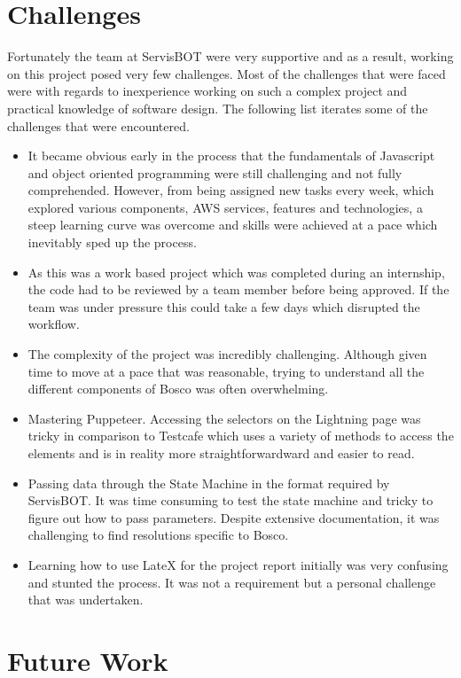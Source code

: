 \documentclass[12pt,a4paper,titlepage]{report}
\begin{document}
\section{Challenges}
Fortunately the team at ServisBOT were very supportive and as a result, working on this project posed very few challenges. 
Most of the challenges that were faced were with regards to inexperience working on such a complex project and practical knowledge of software design.
The following list iterates some of the challenges that were encountered.
\begin{itemize}
  \item It became obvious early in the process that the fundamentals of Javascript and object oriented programming were still challenging and not fully comprehended. However, from being assigned new tasks every week, which explored 
  various components, AWS services, features and technologies, a steep learning curve was overcome and skills were achieved at a pace which inevitably sped up the process.
  \item As this was a work based project which was completed during an internship, the code had to be reviewed by a team member before being approved. If the team was under pressure this could take a few days which disrupted the workflow.
  \item The complexity of the project was incredibly challenging. Although given time to move at a pace that was reasonable, trying to understand all the different components of Bosco was often overwhelming.
  \item Mastering Puppeteer. Accessing the selectors on the Lightning page was tricky in comparison to Testcafe which uses a variety of methods to access the elements and is in reality more straightforwardward and easier to read.
  \item Passing data through the State Machine in the format required by ServisBOT. It was time consuming to test the state machine and tricky to figure out how to pass parameters. Despite extensive documentation, it was challenging to find resolutions specific to Bosco. 
  \item Learning how to use LateX for the project report initially was very confusing and stunted the process. It was not a requirement but a personal challenge that was undertaken. 
\end{itemize}
\section{Future Work}
\end{document}
